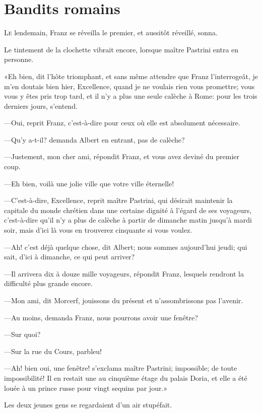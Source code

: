 \chapter{Bandits romains}

\lettrine{L}{e} lendemain, Franz se réveilla le premier, et aussitôt réveillé, sonna. 

\zz
Le tintement de la clochette vibrait encore, lorsque maître Pastrini entra en personne. 

«Eh bien, dit l'hôte triomphant, et sans même attendre que Franz l'interrogeât, je m'en doutais bien hier, Excellence, quand je ne voulais rien vous promettre; vous vous y êtes pris trop tard, et il n'y a plus une seule calèche à Rome: pour les trois derniers jours, s'entend. 

—Oui, reprit Franz, c'est-à-dire pour ceux où elle est absolument nécessaire. 

—Qu'y a-t-il? demanda Albert en entrant, pas de calèche? 

—Justement, mon cher ami, répondit Franz, et vous avez deviné du premier coup. 

—Eh bien, voilà une jolie ville que votre ville éternelle! 

—C'est-à-dire, Excellence, reprit maître Pastrini, qui désirait maintenir la capitale du monde chrétien dans une certaine dignité à l'égard de ses voyageurs, c'est-à-dire qu'il n'y a plus de calèche à partir de dimanche matin jusqu'à mardi soir, mais d'ici là vous en trouverez cinquante si vous voulez. 

—Ah! c'est déjà quelque chose, dit Albert; nous sommes aujourd'hui jeudi; qui sait, d'ici à dimanche, ce qui peut arriver? 

—Il arrivera dix à douze mille voyageurs, répondit Franz, lesquels rendront la difficulté plus grande encore. 

—Mon ami, dit Morcerf, jouissons du présent et n'assombrissons pas l'avenir. 

—Au moins, demanda Franz, nous pourrons avoir une fenêtre? 

—Sur quoi? 

—Sur la rue du Cours, parbleu! 

—Ah! bien oui, une fenêtre! s'exclama maître Pastrini; impossible; de toute impossibilité! Il en restait une au cinquième étage du palais Doria, et elle a été louée à un prince russe pour vingt sequins par jour.» 

Les deux jeunes gens se regardaient d'un air stupéfait. 

